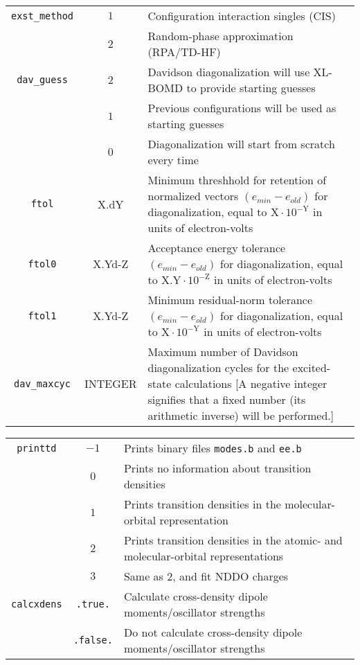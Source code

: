 \documentclass[12pt,letter,footinclude=true,headinclude=true,hyphens]{book} %
\begin{document}
    \begin{tabular}{ | c | c | p{7cm} | }
    \hline
    \texttt{exst\_method} & $1$ & Configuration interaction singles (CIS) \\
    & $2$ & Random-phase approximation (RPA/TD-HF) \\ \hline
    \texttt{dav\_guess} & $2$ & Davidson diagonalization will use XL-BOMD to provide starting guesses \\
    & $1$ & Previous configurations will be used as starting guesses \\
    & $0$ & Diagonalization will start from scratch every time \\ \hline
    \texttt{ftol} & X.dY & Minimum threshhold for retention of normalized vectors $\left ( e_{min} - e_{old} \right )$ for diagonalization, equal to $\mathrm{X} \cdot 10^{-\mathrm{Y}}$ in units of electron-volts \\ \hline
    \texttt{ftol0} & X.Yd-Z & Acceptance energy tolerance $\left ( e_{min} - e_{old} \right )$ for diagonalization, equal to $\mathrm{X.Y} \cdot 10^{-\mathrm{Z}}$ in units of electron-volts \\ \hline
    \texttt{ftol1} & X.Yd-Z & Minimum residual-norm tolerance $\left ( e_{min} - e_{old} \right )$ for diagonalization, equal to $\mathrm{X} \cdot 10^{-\mathrm{Y}}$ in units of electron-volts \\ \hline
    \texttt{dav\_maxcyc} & INTEGER & Maximum number of Davidson diagonalization cycles for the excited-state calculations [A negative integer signifies that a fixed number (its arithmetic inverse) will be performed.] \\ \hline
    \end{tabular}
    
    \begin{tabular}{ | c | c | p{7cm} | }
    \hline
    \texttt{printtd} & $-1$ & Prints binary files \texttt{modes.b} and \texttt{ee.b} \\
    & $0$ & Prints no information about transition densities \\
    & $1$ & Prints transition densities in the molecular-orbital representation \\
    & $2$ & Prints transition densities in the atomic- and molecular-orbital representations \\
    & $3$ & Same as $2$, and fit NDDO charges \\
    \hline
    \texttt{calcxdens} & \texttt{.true.} & Calculate cross-density dipole moments/oscillator strengths \\
    & \texttt{.false.} & Do not calculate cross-density dipole moments/oscillator strengths \\
    \hline
    \end{tabular}
    
\end{document}
